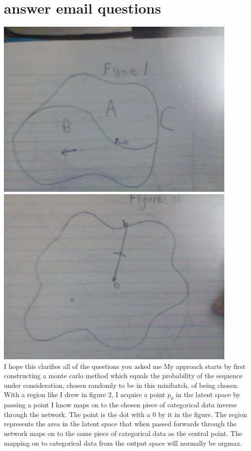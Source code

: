 \documentclass[12pt]{article}
\begin{document}
\section{answer email questions}
\includegraphics[width=120mm]{figure1.jpg}\\
\includegraphics[width=120mm]{figure2.jpg}\\
I hope this clarifies all of the questions you asked me
My approach starts by first constructing a monte carlo method which equals the probability of the sequence under consideration, chosen randomly to be in this minibatch, of being chosen.  
With a region like I drew in figure 2, I acquire a point $p_0$ in the latent space by passing a point I know maps on to the chosen piece of categorical data inverse through the network. The point is the dot with a 0 by it in the figure. The region represents the area in the latent space that when passed forwards through the network maps on to the same piece of categorical data as the central point. The mapping on to categorical data from the output space will normally be argmax. \\
\end{document}
